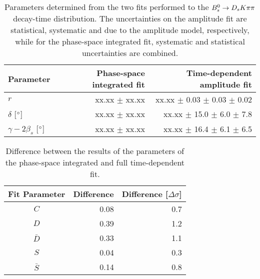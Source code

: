 \begin{table}[h]
\centering
\caption{Parameters determined from the two fits performed to the ${{B}^0_{s}}\rightarrow{\ensuremath{{D}_{s}}}{\ensuremath{K}}{\ensuremath{\pi}}{\ensuremath{\pi}}$ decay-time distribution. 
The uncertainties on the amplitude fit are statistical, systematic and due to the amplitude model, respectively, while for the phase-space integrated fit, systematic and statistical uncertainties are combined.}
\begin{tabular}{l r r }
\hline
\hline
Parameter & Phase-space integrated fit & Time-dependent amplitude fit \\
\hline
$r$ & xx.xx $\pm$ xx.xx  & xx.xx $\pm$ 0.03 $\pm$ 0.03 $\pm$ 0.02 \\
$\delta$ [$^{\circ}$] & xx.xx $\pm$ xx.xx & xx.xx $\pm$ 15.0 $\pm$ 6.0 $\pm$ 7.8 \\
$\gamma - 2 \beta_s$ [$^{\circ}$] & xx.xx $\pm$ xx.xx  & xx.xx $\pm$ 16.4 $\pm$ 6.1 $\pm$ 6.5 \\
\hline
\hline
\end{tabular}
\label{tab:ResultSummary}
\end{table}

\begin{table}[h]
\centering
\caption{
Difference between the results of the \CP parameters of the phase-space integrated and full time-dependent fit.
}
	\renewcommand{\arraystretch}{1.5}
\begin{tabular}{c r r} 
\hline
\hline
Fit Parameter & \multicolumn{1}{c}{Difference}  &\multicolumn{1}{c}{ Difference [$\Delta\sigma$]}  \\ 
\hline
$C$ & 0.08 & 0.7\\ 
$D$ & 0.39 & 1.2\\ 
$\bar{D}$ & 0.33 & 1.1\\ 
$S$ & 0.04 & 0.3\\ 
$\bar{S}$ & 0.14  & 0.8\\ 
\hline
\hline
\end{tabular}
\label{tab:compareCP}
\end{table}

